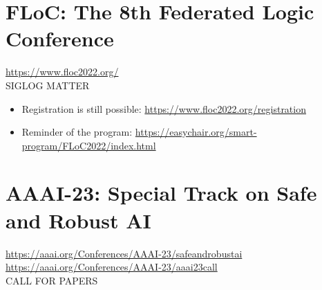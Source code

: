\documentclass[prodmode,acmtecs]{acmsmall} %
\begin{document}
\section{FLoC: The 8th Federated Logic Conference}\label{FLoC}  \href{https://www.floc2022.org/}{https://www.floc2022.org/}\\ 
SIGLOG MATTER 

\begin{itemize}\item  Registration is still possible: \href{https://www.floc2022.org/registration}{https://www.floc2022.org/registration} 
 
\item  Reminder of the program: \href{https://easychair.org/smart-program/FLoC2022/index.html}{https://easychair.org/smart-program/FLoC2022/index.html} 
 
\end{itemize}\section{AAAI-23: Special Track on Safe and Robust AI}\label{AAAI23}  \href{https://aaai.org/Conferences/AAAI-23/safeandrobustai}{https://aaai.org/Conferences/AAAI-23/safeandrobustai} \\ 
  \href{https://aaai.org/Conferences/AAAI-23/aaai23call}{https://aaai.org/Conferences/AAAI-23/aaai23call}\\ 
CALL FOR PAPERS 
\end{document}
